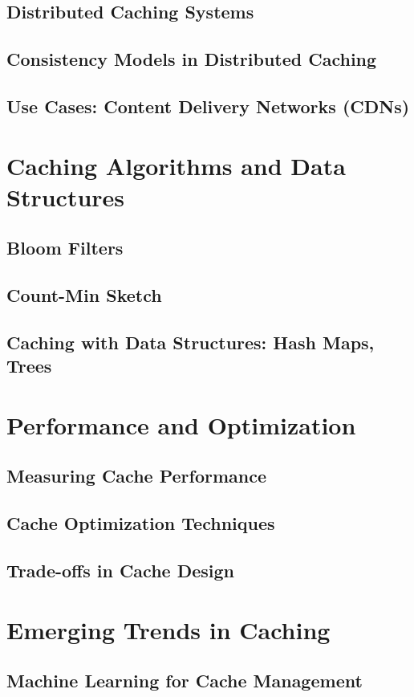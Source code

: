 \documentclass[12pt]{book} %
\begin{document}
\subsection{Distributed Caching Systems}
\subsection{Consistency Models in Distributed Caching}
\subsection{Use Cases: Content Delivery Networks (CDNs)}

\section{Caching Algorithms and Data Structures}
\subsection{Bloom Filters}
\subsection{Count-Min Sketch}
\subsection{Caching with Data Structures: Hash Maps, Trees}

\section{Performance and Optimization}
\subsection{Measuring Cache Performance}
\subsection{Cache Optimization Techniques}
\subsection{Trade-offs in Cache Design}

\section{Emerging Trends in Caching}
\subsection{Machine Learning for Cache Management}
\end{document}
